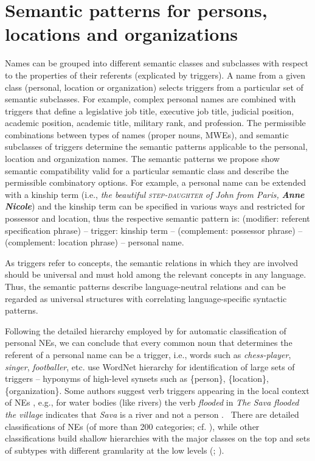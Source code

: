 \documentclass[output=paper]{langsci/langscibook}
\newcommand{\trigger}[1]{\textsc{#1}}
\begin{document}

\section{Semantic patterns for persons, locations and organizations}

Names can be grouped into different semantic classes and subclasses with
respect to the properties of their referents (explicated by triggers).
A name from a given class (personal, location or organization) selects
triggers from a particular set of semantic subclasses. For example,
complex personal names are combined with triggers that define a
legislative job title, executive job title, judicial position, academic
position, academic title, military rank, and profession. The
permissible combinations between types of names (proper nouns, MWEs),
and semantic subclasses of triggers determine the semantic patterns
applicable to the personal, location and organization names. The
semantic patterns  we propose show semantic compatibility valid for a
particular semantic class and describe the permissible combinatory
options. For example, a personal name can be extended with a kinship
term (i.e., \textit{the beautiful
}\textit{\trigger{step-daughter}}\textit{ of John from Paris,
}\textbf{\textit{Anne Nicole}}) and the kinship term can be specified
in various ways and restricted for possessor and location, thus the
respective semantic pattern is: (modifier: referent specification
phrase) – trigger: kinship term – (complement: possessor phrase) –
(complement: location phrase) – personal name.

As triggers refer to concepts, the semantic relations in which they are
involved should be universal and must hold among the relevant concepts
in any language. Thus, the semantic patterns describe language-neutral
relations and can be regarded as universal structures with correlating
language-specific syntactic patterns.



Following the detailed hierarchy employed by \cite{giuliano2009}  for
automatic classification of personal NEs, we can conclude that every
common noun that determines the referent of a personal name can be a
trigger, i.e., words such as \textit{chess-player}, \textit{singer},
\textit{footballer}, etc. \cite{magnini2002} use WordNet hierarchy
for identification of large sets of triggers – hyponyms of high-level
synsets such as \{person\}, \{location\}, \{organization\}. Some
authors suggest verb triggers appearing in the local context of NEs
\citep{zhang2004}, e.g., for water bodies (like rivers) the verb \textit{flooded} in \textit{The
Sava flooded the village}
indicates that \textit{Sava} is a river and not a person . \ There are detailed classifications of NEs
(of more than 200 categories; cf. \citealt{sekine2004}), while other
classifications build shallow hierarchies with the major classes on the
top and sets of subtypes with different granularity at the low levels
(\citealt{ace2008}; \citealt{fleischman2002}).
\end{document}
